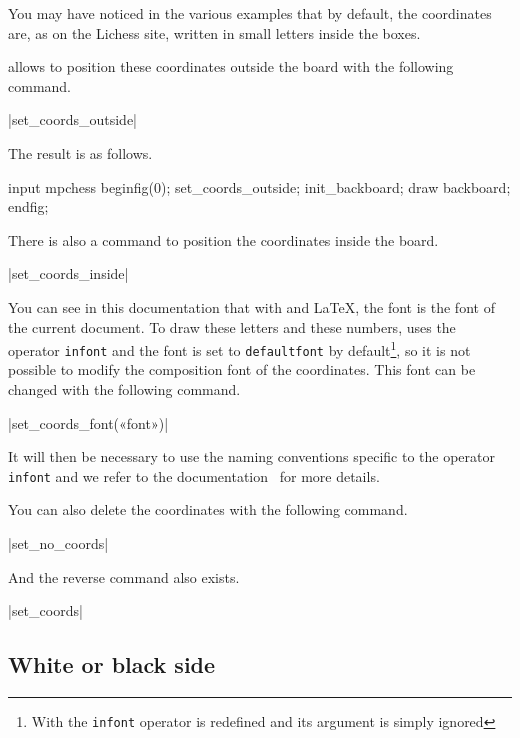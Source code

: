 \documentclass[english]{ltxdoc}
\begin{document}
You may have noticed in the various examples that by default, the coordinates are, as on the Lichess site, written in small letters inside the boxes.

\mpchess allows to position these coordinates outside the board with the
following command. 

\commande|set_coords_outside|\smallskip

The result is as follows.



\begin{ExempleMP}
input mpchess
beginfig(0);
set_coords_outside;
init_backboard;
draw backboard;
endfig;
\end{ExempleMP}

There is also a command to position the coordinates inside the board.

\commande|set_coords_inside|\smallskip

You can see in this documentation that with  and
\LaTeX, the font is the font of the current document. To draw these letters and
these numbers, \mpchess uses the \MP{} operator  \lstinline+infont+ and the font
is set to \lstinline+defaultfont+ by default\footnote{With 
the \lstinline+infont+ operator is redefined and its argument is simply
ignored}, so it is not possible to modify the composition font of the
coordinates. This font can be changed with the following command.

\commande|set_coords_font(«font»)|\smallskip

It will then be necessary to use the naming conventions specific to the \MP{}
operator
\lstinline+infont+ and we refer to the
documentation~\cite{ctan-metapost} for more details.

You can also delete the coordinates with the following command.

\commande|set_no_coords|\smallskip

And the reverse command also exists.

\commande|set_coords|\smallskip


\subsection{White or black side}
\end{document}
